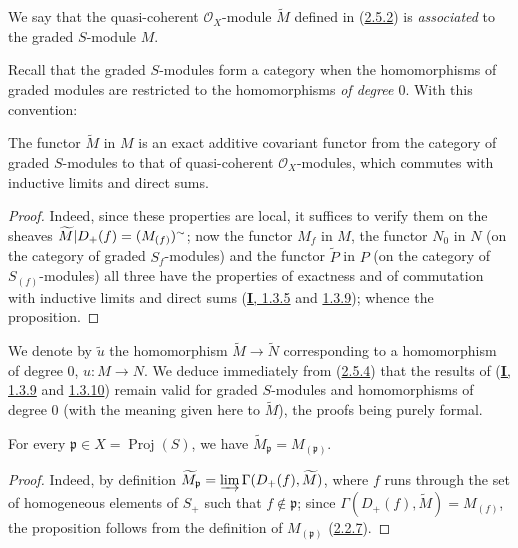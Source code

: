 \begin{definition}[2.5.3]
\label{II.2.5.3}
We say that the quasi-coherent $\mathcal{O}_X$-module $\widetilde{M}$
defined in (\hyperref[II.2.5.2]{2.5.2}) is \emph{associated} to the
graded $S$-module $M$.
\end{definition}

Recall that the graded $S$-modules form a category when the
homomorphisms of graded modules are restricted to the homomorphisms
\emph{of degree $0$}. With this convention:

\begin{proposition}[2.5.4]
\label{II.2.5.4}
The functor $\widetilde{M}$ in $M$ is an exact additive covariant functor
from the category of graded $S$-modules to that of quasi-coherent
$\mathcal{O}_X$-modules, which commutes with inductive limits and direct
sums.
\end{proposition}

\begin{proof}
Indeed, since these properties are local, it suffices to verify them on
the sheaves
$\widetilde{M}|D_+(f)=(M_{(f)})^{\sim}$; now the functor
$M_f$ in $M$, the functor $N_0$ in $N$ (on the category of graded
$S_f$-modules) and the functor $\widetilde{P}$ in $P$ (on the
category of $S_{(f)}$-modules) all three have the properties of exactness
and of commutation with inductive limits and direct sums
(\hyperref[I.1.3.5]{\textbf{I}, 1.3.5} and
\hyperref[I.1.3.9]{1.3.9}); whence the proposition.
\end{proof}

We denote by $\widetilde{u}$ the homomorphism
$\widetilde{M}\to\widetilde{N}$ corresponding to a homomorphism of degree
$0$, $u:M\to N$. We deduce immediately from
(\hyperref[II.2.5.4]{2.5.4}) that the results of
(\hyperref[I.1.3.9]{\textbf{I}, 1.3.9} and
\hyperref[I.1.3.10]{1.3.10}) remain valid for graded
$S$-modules and homomorphisms of degree $0$ (with the meaning given
here to $\widetilde{M}$), the proofs being purely formal.

\begin{proposition}[2.5.5]
\label{II.2.5.5}
For every $\mathfrak{p}\in X=\operatorname{Proj}(S)$, we have
$\widetilde{M}_{\mathfrak{p}}=M_{(\mathfrak{p})}$.
\end{proposition}

\begin{proof}
Indeed, by definition
$\widetilde{M}_{\mathfrak{p}}=
\varinjlim\Gamma(D_+(f),\widetilde{M})$, where $f$ runs through the set of
homogeneous elements of $S_+$ such that $f\notin\mathfrak{p}$; since
$\Gamma(D_+(f),\widetilde{M})=M_{(f)}$, the proposition follows from the
definition of $M_{(\mathfrak{p})}$
(\hyperref[II.2.2.7]{2.2.7}).
\end{proof}

